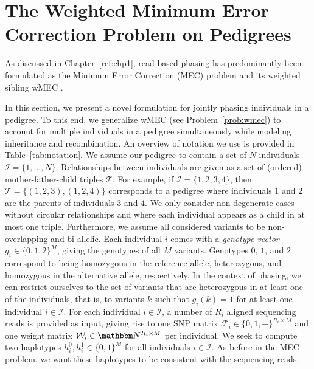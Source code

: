 \section{The Weighted Minimum Error Correction Problem on Pedigrees}
As discussed in Chapter~\ref{ref:chp1}, read-based phasing has predominantly been formulated as the Minimum Error Correction (MEC) problem \citep{Cilibrasi2007} and its weighted sibling wMEC \citep{Greenberg2004}.

In this section, we present a novel formulation for jointly phasing individuals in a pedigree.
To this end, we generalize wMEC (see Problem~\ref{prob:wmec}) to account for multiple individuals in a pedigree simultaneously while modeling inheritance and recombination.
An overview of notation we use is provided in Table~\ref{tab:notation}.
We assume our pedigree to contain a set of $N$ individuals $\mathcal{I}=\{1,\ldots,N\}$.
Relationships between individuals are given as a set of (ordered) mother-father-child triples $\mathcal{T}$.
For example, if $\mathcal{I}=\{1,2,3,4\}$, then $\mathcal{T}=\big\{(1,2,3),(1,2,4)\big\}$ corresponds to a pedigree where individuals $1$ and $2$ are the parents of individuals $3$ and $4$.
We only consider non-degenerate cases without circular relationships and where each individual appears as a child in at most one triple.
Furthermore, we assume all considered variants to be non-overlapping and bi-allelic.
Each individual $i$ comes with a \emph{genotype vector} $g_i\in\{0,1,2\}^M$, giving the genotypes of all $M$ variants.
Genotypes $0$, $1$, and $2$ correspond to being homozygous in the reference allele, heterozygous, and homozygous in the alternative allele, respectively.
In the context of phasing, we can restrict ourselves to the set of variants that are heterozygous in at least one of the individuals, that is, to variants $k$ such that $g_i(k)=1$ for at least one individual $i\in\mathcal{I}$.
For each individual $i\in \mathcal{I}$, a number of $R_i$ aligned sequencing reads is provided as input, giving rise to one SNP matrix $\mathcal{F}_i\in\{0,1,-\}^{R_i\times M}$ and one weight matrix $\mathcal{W}_i\in\N^{R_i\times M}$ per individual.
We seek to compute two haplotypes $h^0_i,h^1_i\in\{0,1\}^M$ for all individuals $i\in\mathcal{I}$.
As before in the MEC problem, we want these haplotypes to be consistent with the sequencing reads.

